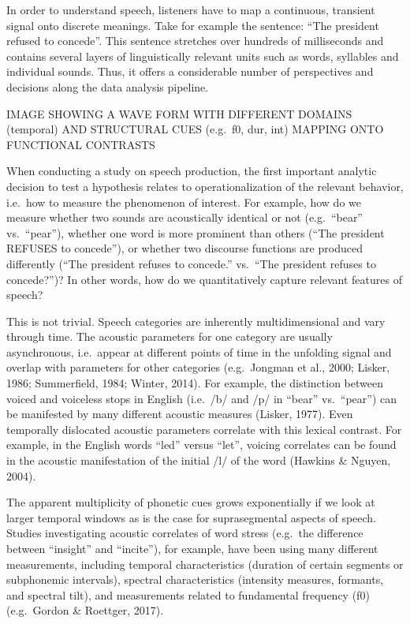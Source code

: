 \documentclass[
  english,
  man]{apa6}
\begin{document}
In order to understand speech, listeners have to map a continuous, transient signal onto discrete meanings. Take for example the sentence: \enquote{The president refused to concede}. This sentence stretches over hundreds of milliseconds and contains several layers of linguistically relevant units such as words, syllables and individual sounds. Thus, it offers a considerable number of perspectives and decisions along the data analysis pipeline.

IMAGE SHOWING A WAVE FORM WITH DIFFERENT DOMAINS (temporal) AND STRUCTURAL CUES (e.g.~f0, dur, int) MAPPING ONTO FUNCTIONAL CONTRASTS

When conducting a study on speech production, the first important analytic decision to test a hypothesis relates to operationalization of the relevant behavior, i.e.~how to measure the phenomenon of interest.
For example, how do we measure whether two sounds are acoustically identical or not (e.g.~\enquote{bear} vs.~\enquote{pear}), whether one word is more prominent than others (\enquote{The president REFUSES to concede}), or whether two discourse functions are produced differently (\enquote{The president refuses to concede.} vs.~\enquote{The president refuses to concede?})?
In other words, how do we quantitatively capture relevant features of speech?

This is not trivial.
Speech categories are inherently multidimensional and vary through time.
The acoustic parameters for one category are usually asynchronous, i.e.~appear at different points of time in the unfolding signal and overlap with parameters for other categories (e.g.~Jongman et al., 2000; Lisker, 1986; Summerfield, 1984; Winter, 2014).
For example, the distinction between voiced and voiceless stops in English (i.e.~/b/ and /p/ in \enquote{bear} vs.~\enquote{pear}) can be manifested by many different acoustic measures (Lisker, 1977).
Even temporally dislocated acoustic parameters correlate with this lexical contrast.
For example, in the English words \enquote{led} versus \enquote{let}, voicing correlates can be found in the acoustic manifestation of the initial /l/ of the word (Hawkins \& Nguyen, 2004).

The apparent multiplicity of phonetic cues grows exponentially if we look at larger temporal windows as is the case for suprasegmental aspects of speech.
Studies investigating acoustic correlates of word stress (e.g.~the difference between \enquote{insight} and \enquote{incite}), for example, have been using many different measurements, including temporal characteristics (duration of certain segments or subphonemic intervals), spectral characteristics (intensity measures, formants, and spectral tilt), and measurements related to fundamental frequency (f0) (e.g.~Gordon \& Roettger, 2017).
\end{document}
